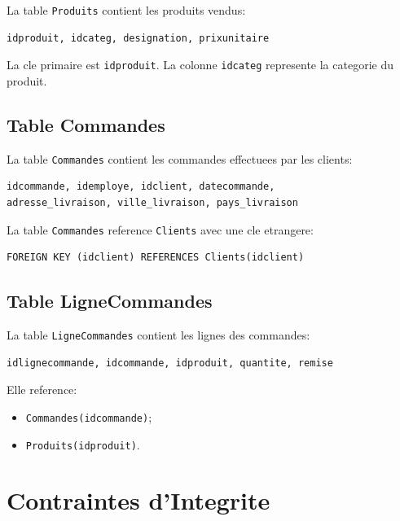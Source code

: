 \documentclass[12pt,a4paper]{report}
\begin{document}
La table \texttt{Produits} contient les produits vendus:

\begin{lstlisting}[style=textstyle]
idproduit, idcateg, designation, prixunitaire
\end{lstlisting}

La cle primaire est \texttt{idproduit}. La colonne \texttt{idcateg} represente la categorie du produit.

\section{Table Commandes}

La table \texttt{Commandes} contient les commandes effectuees par les clients:

\begin{lstlisting}[style=textstyle]
idcommande, idemploye, idclient, datecommande,
adresse_livraison, ville_livraison, pays_livraison
\end{lstlisting}

La table \texttt{Commandes} reference \texttt{Clients} avec une cle etrangere:

\begin{lstlisting}[style=sqlstyle]
FOREIGN KEY (idclient) REFERENCES Clients(idclient)
\end{lstlisting}

\section{Table LigneCommandes}

La table \texttt{LigneCommandes} contient les lignes des commandes:

\begin{lstlisting}[style=textstyle]
idlignecommande, idcommande, idproduit, quantite, remise
\end{lstlisting}

Elle reference:

\begin{itemize}
    \item \texttt{Commandes(idcommande)};
    \item \texttt{Produits(idproduit)}.
\end{itemize}

\chapter{Contraintes d'Integrite}
\end{document}
